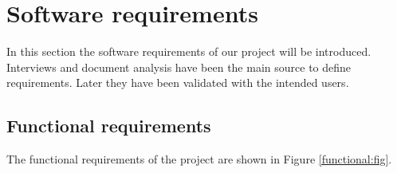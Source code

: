 \section{Software requirements}

In this section the software requirements of our project will be introduced.  Interviews and document analysis have been the main source to define requirements. Later they have been validated with the intended users.

\subsection{Functional requirements}

The functional requirements of the project are shown in Figure
\ref{functional:fig}.


\begin{figure}[ht!]


\end{figure}
